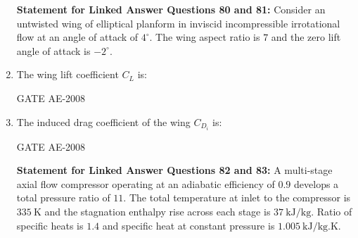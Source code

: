 \documentclass[journal,12pt,onecolumn]{IEEEtran}
\theoremstyle{remark}
\begin{document}
\begin{enumerate}
\quad 

\textbf{Statement for Linked Answer Questions 80 and 81:}  
Consider an untwisted wing of elliptical planform in inviscid incompressible irrotational flow at an angle of attack of $4^\circ$.  
The wing aspect ratio is $7$ and the zero lift angle of attack is $-2^\circ$.\\

\item The wing lift coefficient $C_L$ is:  \\

\begin{enumerate}
\end{enumerate}
\hfill{GATE AE-2008}

\quad 

\item The induced drag coefficient of the wing $C_{D_i}$ is:  \\

\begin{enumerate}
\end{enumerate}
\hfill{GATE AE-2008}

\quad 

\textbf{Statement for Linked Answer Questions 82 and 83:}  
A multi-stage axial flow compressor operating at an adiabatic efficiency of $0.9$ develops a total pressure ratio of $11$.  
The total temperature at inlet to the compressor is $335 \ \text{K}$ and the stagnation enthalpy rise across each stage is $37 \ \text{kJ/kg}$.  
Ratio of specific heats is $1.4$ and specific heat at constant pressure is $1.005 \ \text{kJ/kg.K}$.\\


\end{enumerate}
\end{document}
